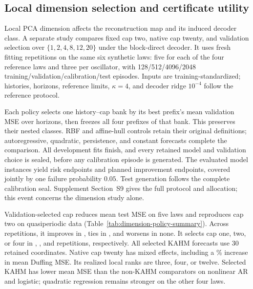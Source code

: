\subsection{Local dimension selection and certificate utility}
\label{sec:dimension-policy}

Local PCA dimension affects the reconstruction map and its induced decoder
class. A separate study compares fixed cap two, native cap twenty, and
validation selection over $\{1,2,4,8,12,20\}$ under the block-direct decoder.
It uses \DimRepetitions{} fresh fitting repetitions on the same six synthetic
laws: five for each of the four reference laws and three per oscillator, with
128/512/4096/2048 training/validation/calibration/test episodes. Inputs are
training-standardized; histories, horizons, reference limits, $\kappa=4$,
and decoder ridge $10^{-4}$ follow the reference protocol.

Each policy selects one history--cap bank by its best prefix's mean validation
MSE over horizons, then freezes all four prefixes of that bank. This preserves
their nested classes. RBF and affine-hull controls retain their original
definitions; autoregressive, quadratic, persistence, and constant forecasts
complete the comparison. All \DimDevelopmentFits{} development fits finish,
and every retained model and validation choice is sealed, before any
calibration episode is generated.
The \DimEvaluatedModels{} evaluated model instances yield \DimRiskTails{}
risk endpoints and \DimImprovementTails{} planned improvement endpoints,
covered jointly by one failure probability $0.05$. Test generation follows
the complete calibration seal. Supplement Section~S9 gives the full protocol
and allocation; this event concerns the dimension study alone.



Validation-selected cap reduces mean test MSE on five laws and reproduces
cap two on quasiperiodic data (Table~\ref{tab:dimension-policy-summary}).
Across repetitions, it improves in \DimBetterRuns{}, ties in \DimEqualRuns{},
and worsens in none. It selects cap one, two, or four in
\DimCapOneCount{}, \DimCapTwoCount{}, and \DimCapFourCount{} repetitions,
respectively. All \DimSelectedForecasts{} selected KAHM forecasts use 30
retained coordinates. Native cap twenty has mixed effects, including a
\DimNativeDuffingIncrease\% increase in mean Duffing MSE. Its realized local
ranks are three, four, or twelve. Selected KAHM has lower mean MSE than the
non-KAHM comparators on nonlinear AR and logistic; quadratic regression
remains stronger on the other four laws.


